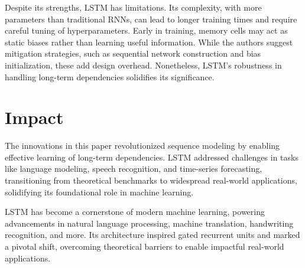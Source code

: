 \documentclass[10pt]{article}
\begin{document}
Despite its strengths, LSTM has limitations. Its complexity, with more parameters than traditional RNNs, can lead to longer training times and require careful tuning of hyperparameters. Early in training, memory cells may act as static biases rather than learning useful information. While the authors suggest mitigation strategies, such as sequential network construction and bias initialization, these add design overhead. Nonetheless, LSTM's robustness in handling long-term dependencies solidifies its significance.

\section*{Impact}
The innovations in this paper revolutionized sequence modeling by enabling effective learning of long-term dependencies. LSTM addressed challenges in tasks like language modeling, speech recognition, and time-series forecasting, transitioning from theoretical benchmarks to widespread real-world applications, solidifying its foundational role in machine learning.

LSTM has become a cornerstone of modern machine learning, powering advancements in natural language processing, machine translation, handwriting recognition, and more. Its architecture inspired gated recurrent units and marked a pivotal shift, overcoming theoretical barriers to enable impactful real-world applications.



\end{document}
